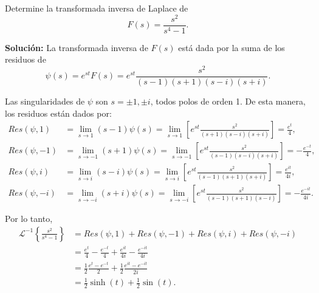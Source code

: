 \begin{ejemplo}
    Determine la transformada inversa de Laplace de 
    $$F(s) = \frac{s^2}{s^4-1}.$$

    \textbf{Solución:} La transformada inversa de $F(s)$ está dada por la suma de los residuos de
    $$\psi(s) = e^{st} F(s) = e^{st} \frac{s^2}{(s-1)(s+1)(s-i)(s+i)}.$$

    Las singularidades de $\psi$ son $s = \pm 1, \pm i$, todos polos de orden 1. De esta manera, los residuos están dados por:
    \begin{align*}
        Res(\psi, 1) &= \lim_{s \to 1} (s-1) \psi(s) = \lim_{s\to 1} \left[e^{st} \frac{s^2}{(s+1)(s-i)(s+i)} \right] = \frac{e^t}{4},\\
        Res(\psi, -1) &= \lim_{s \to -1} (s+1) \psi(s) = \lim_{s\to -1} \left[e^{st} \frac{s^2}{(s-1)(s-i)(s+i)} \right] = -\frac{e^{-t}}{4}, \\
        Res(\psi, i) &= \lim_{s \to i} (s-i) \psi(s) = \lim_{s\to i} \left[e^{st} \frac{s^2}{(s-1)(s+1)(s+i)} \right] = \frac{e^{it}}{4i}, \\
        Res(\psi, -i) &= \lim_{s \to -i} (s+i) \psi(s) = \lim_{s\to -i} \left[e^{st} \frac{s^2}{(s-1)(s+1)(s-i)} \right] = -\frac{e^{-it}}{4i}.
    \end{align*}

    Por lo tanto,
    \begin{align*}
        \mathcal{L}^{-1} \left\{\frac{s^2}{s^4-1} \right\} &= Res(\psi,1) + Res(\psi,-1) + Res(\psi,i) + Res(\psi, -i) \\
        &= \frac{e^t}{4} - \frac{e^{-t}}{4} + \frac{e^{it}}{4i} - \frac{e^{-it}}{4i} \\
        &= \frac{1}{2} \frac{e^t - e^{-t}}{2} + \frac{1}{2} \frac{e^{it} - e^{-it}}{2i} \\
        &= \frac{1}{2} \sinh(t) + \frac{1}{2} \sin(t).
    \end{align*}
\end{ejemplo}




